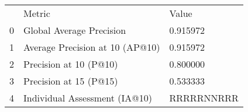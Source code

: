 \begin{tabular}{lll}
 & Metric & Value \\
0 & Global Average Precision & 0.915972 \\
1 & Average Precision at 10 (AP@10) & 0.915972 \\
2 & Precision at 10 (P@10) & 0.800000 \\
3 & Precision at 15 (P@15) & 0.533333 \\
4 & Individual Assessment (IA@10) & RRRRRNNRRR \\
\end{tabular}
